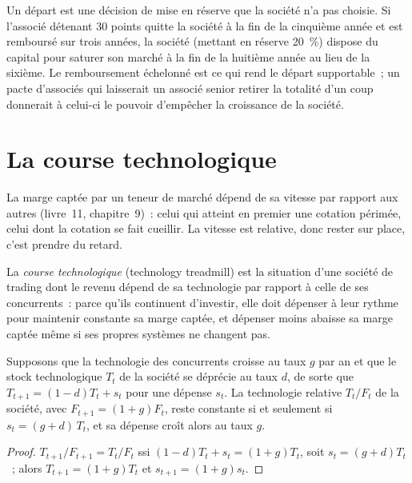 Un départ est une décision de mise en réserve que la société n'a pas choisie. Si l'associé détenant 30 points quitte la société à la fin de la cinquième année et est remboursé sur trois
années, la société (mettant en réserve 20~\%) dispose du capital pour saturer son marché à la fin de la huitième année au lieu de la sixième. Le remboursement échelonné est ce qui rend le départ supportable~; un
pacte d'associés qui laisserait un associé senior retirer la totalité d'un coup donnerait à celui-ci le pouvoir d'empêcher la croissance de la société.

\section{La course technologique}

La marge captée par un teneur de marché dépend de sa vitesse par rapport aux autres (livre~11, chapitre~9)~: celui qui atteint en premier une cotation périmée,
celui dont la cotation se fait cueillir. La vitesse est relative, donc rester sur place, c'est prendre du retard.

\begin{definition}\label{def:fm:the-proprietary-market-making-firm:treadmill}
La \emph{course technologique} (technology treadmill) est la situation d'une société de trading dont le revenu dépend de sa technologie par rapport à
celle de ses concurrents~: parce qu'ils continuent d'investir, elle doit dépenser à leur rythme pour maintenir constante sa marge captée, et dépenser moins abaisse sa marge captée
même si ses propres systèmes ne changent pas.
\end{definition}

\begin{proposition}\label{prop:fm:the-proprietary-market-making-firm:parity}
Supposons que la technologie des concurrents croisse au taux $g$ par an et que le stock technologique $T_t$ de la société se déprécie au taux $d$, de sorte que
$T_{t+1}=(1-d)T_t+s_t$ pour une dépense $s_t$. La technologie relative $T_t/F_t$ de la société, avec $F_{t+1}=(1+g)F_t$, reste constante si et seulement si
$s_t=(g+d)\,T_t$, et sa dépense croît alors au taux $g$.
\end{proposition}

\begin{proof}
$T_{t+1}/F_{t+1}=T_t/F_t$ ssi $(1-d)T_t+s_t=(1+g)T_t$, soit $s_t=(g+d)T_t$~; alors $T_{t+1}=(1+g)T_t$ et $s_{t+1}=(1+g)s_t$.
\end{proof}

